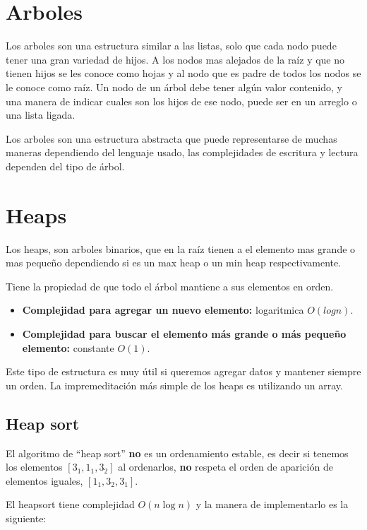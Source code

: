 \section{Arboles}

Los arboles son una estructura similar a las listas, solo que cada nodo puede tener una gran variedad de hijos. A los nodos mas alejados de la raíz y que no tienen hijos se les conoce como hojas y al nodo que es padre de todos los nodos se le conoce como raíz. Un nodo de un árbol debe tener algún valor contenido, y una manera de indicar cuales son los hijos de ese nodo, puede ser en un arreglo o una lista ligada.

Los arboles son una estructura abstracta que puede representarse de muchas maneras dependiendo del lenguaje usado, las complejidades de escritura y lectura dependen del tipo de árbol.

\section{Heaps}

Los heaps, son arboles binarios, que en la raíz tienen a el elemento mas grande o mas pequeño dependiendo si es un max heap o un min heap respectivamente.

Tiene la propiedad de que todo el árbol mantiene a sus elementos en orden.

\begin{itemize}
    \item \textbf{Complejidad para agregar un nuevo elemento:} logaritmica $O(log n)$.
    \item \textbf{Complejidad para buscar el elemento más grande o más pequeño elemento:} constante $O(1)$.
\end{itemize}

Este tipo de estructura es muy útil si queremos agregar datos y mantener siempre un orden. La impremeditación más simple de los heaps es utilizando un array. 

\subsection{Heap sort}

El algoritmo de ``heap sort'' \textbf{no} es un ordenamiento estable, es decir si tenemos los elementos $[3_1, 1_1,3_2]$ al ordenarlos, \textbf{no} respeta el orden de aparición de elementos iguales, $[1_1,3_2,3_1]$.

El heapsort tiene complejidad $O(n \log n)$ y la manera de implementarlo es la siguiente:

